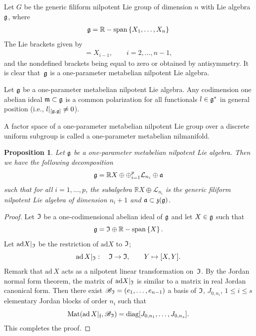 \documentclass[11pt]{article}
\newtheorem{proposition}{Proposition}
\providecommand{\mathds}[1]{\mathbb{#1}}
\newcommand{\set}[1]{\left\{#1\right\}}
\DeclareMathOperator{\spann}{\mathds{R}-span}
\begin{document}
 \begin{example}
  Let $G$ be the generic f\/iliform
nilpotent Lie group of dimension $n$ with Lie algebra $\frak g$,
where
\begin{gather*}
 \frak g = \spann\set{X_1,
\ldots, X_n}
\end{gather*}
The Lie brackets  given by
\begin{gather*}
[X_n, X_i] = X_{i-1},  \qquad i=2,\ldots,  n-1,
\end{gather*}
and the nondef\/ined brackets being equal to zero or obtained by
antisymmetry. It is clear that~$\frak g$ is a one-parameter
metabelian nilpotent Lie algebra.
\end{example}

\begin{remark} Let $\frak g$ be a one-parameter metabelian
 nilpotent Lie algebra. Any
codimension one abelian ideal $\frak m\subset \frak g$ is a common
polarization for all functionals $l\in \frak g^*$ in general
position (i.e.,  $l\vert_{[\frak g, \frak g]}\ne 0$).
\end{remark}


\begin{definition}\sloppy
A factor space of a one-parameter met\-abe\-lian nilpotent Lie group
over a discrete uniform subgroup is called a one-parameter
metabelian nilmanifold.
\end{definition}


\begin{proposition}\label{decomposition-speciale} Let $\frak g$ be a
one-parameter metabelian nilpotent Lie algebra. Then we have the
following decomposition
\begin{gather*}
\frak g = \mathds{R} X \oplus \oplus_{i=1}^p \mathcal{L}_{n_i}
\oplus \frak a
\end{gather*}
such that for all $i=1,\ldots, p$, the subalgebra $\mathds{R} X
\oplus  \mathcal{L}_{n_i} $ is the generic filiform nilpotent Lie
algebra of dimension $n_i+1$ and $\frak a \subset \frak z(\frak g)$.
 \end{proposition}

 \begin{proof} Let $\frak I$ be a one-codimensional abelian ideal of
 $\frak  g$ and let $X\in \frak g$ such that
\[
\frak g= \frak I\oplus \spann\set{X}.
\]
 Let $\mathrm{ad} X\vert_{\frak I}$ be the
 restriction of $\mathrm{ad}
 X$ to $\frak I$;
\[
\mathrm{ad}\, X\vert_{\frak I}: \quad \frak I\rightarrow \frak I,\qquad
 Y\mapsto [X, Y].
 \]
 Remark that $\mathrm{ad}\, X$ acts as a nilpotent linear
 transformation on~$\frak I$.
 By the Jordan normal form theorem, the matrix of
 $\mathrm{ad} X\vert_{\frak I}$ is similar to a matrix in real Jordan canonical form. Then
 there exist $\mathscr{B}_{\frak I}=(e_1, \ldots, e_{n-1})$  a
 basis of $\frak I$, $J_{0, n_i}$, $1\leq i\leq s$  elementary Jordan
 blocks of order $n_i$ such that
\[
\mathrm{Mat}(\mathrm{ad}\, X\vert_{\frak
 f}, \mathscr{B}_{\frak I}) =
  \mathrm{diag}[J_{0, n_1}, \ldots, J_{0, n_s}].
\]
  This completes the proof.
 \end{proof}
\end{document}
